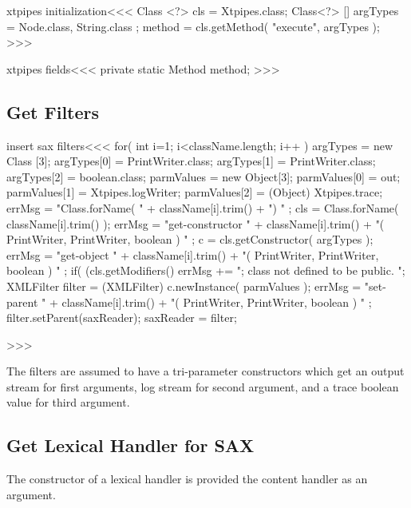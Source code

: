 \documentclass{article}
\begin{document}
{\<xtpipes initialization\><<<
Class <?> cls = Xtpipes.class;
Class<?> [] argTypes = { Node.class, String.class };
method = cls.getMethod( "execute", argTypes );
>>>

\<xtpipes fields\><<<
private static Method method;
>>>

\subsection{Get Filters}



\<insert sax filters\><<<
for( int i=1; i<className.length; i++ ){
   argTypes = new Class [3];
   argTypes[0] = PrintWriter.class;
   argTypes[1] = PrintWriter.class;
   argTypes[2] = boolean.class;
   parmValues = new Object[3];
   parmValues[0] = out;
   parmValues[1] = Xtpipes.logWriter;
   parmValues[2] = (Object) Xtpipes.trace;
   errMsg = "Class.forName( " + className[i].trim() + ") " ;
   cls = Class.forName( className[i].trim() );
   errMsg = "get-constructor "
            + className[i].trim()
            + "( PrintWriter, PrintWriter, boolean ) " ;
   c = cls.getConstructor( argTypes );
   errMsg = "get-object "
            + className[i].trim()
            + "( PrintWriter, PrintWriter, boolean ) " ;
   if( (cls.getModifiers() %
      errMsg += "; class not defined to be public. ";
   }
   XMLFilter filter = (XMLFilter) c.newInstance( parmValues );
   errMsg = "set-parent "
            +  className[i].trim()
            + "( PrintWriter, PrintWriter, boolean ) " ;
   filter.setParent(saxReader);
   saxReader = filter;
}
>>>


The filters are assumed to have a tri-parameter constructors which
get an output stream for first arguments, log stream for second argument, and
a trace boolean value for third argument.



\subsection{Get Lexical Handler for SAX}









The constructor of a lexical handler is provided the
content handler as an argument.
\end{document}
